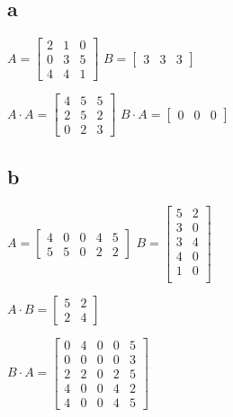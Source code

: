 \documentclass{article}
\begin{document}
\subsection*{a}
$A = \begin{bmatrix}
    2&1&0\\
    0&3&5\\
    4&4&1
\end{bmatrix}$
$B = \begin{bmatrix}
    3&3&3
\end{bmatrix}$

$A\cdot A = \begin{bmatrix}
    4&5&5\\
    2&5&2\\
    0&2&3
\end{bmatrix}$
$B\cdot A = \begin{bmatrix}
    0&0&0
\end{bmatrix}$
\subsection*{b}
$A = \begin{bmatrix}
    4&0&0&4&5\\
    5&5&0&2&2
\end{bmatrix}$
$B = \begin{bmatrix}
    5&2\\
    3&0\\
    3&4\\
    4&0\\
    1&0\\
\end{bmatrix}$


$A\cdot B = \begin{bmatrix}
    5&2\\
    2&4
\end{bmatrix}$

$B\cdot A = \begin{bmatrix}
    0&4&0&0&5\\
    0&0&0&0&3\\
    2&2&0&2&5\\
    4&0&0&4&2\\
    4&0&0&4&5
\end{bmatrix}$
\end{document}
